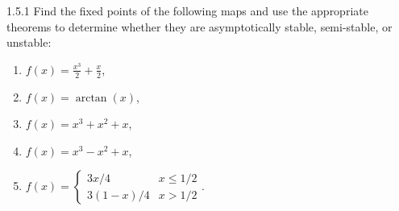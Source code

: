 \begin{problem}{1.5.1}
  Find the fixed points of the following maps and use the appropriate theorems
  to determine whether they are asymptotically stable, semi-stable, or unstable:
  \begin{enumerate}
    \item $f(x) = \frac{x^3}{2} + \frac{x}{2}$,
    \item $f(x) = \arctan(x)$,
    \item $f(x) = x^3 + x^2 + x $,
    \item $f(x) = x^3 - x^2 + x$,
    \item $f(x) = \begin{cases}3x/4 & x \leq 1/2 \\ 3(1-x)/4 & x > 1/2\end{cases}$.
  \end{enumerate}
\end{problem}

